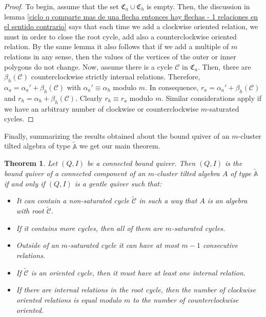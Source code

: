 \documentclass{amsart}
\theoremstyle{plain}
\newtheorem{teo}{Theorem}[section]
\theoremstyle{definition}
\begin{document}
\begin{proof}
To begin, assume that the set $\mathfrak{C}_a\cup \mathfrak{C}_h$ is empty. Then, the  discussion in lemma \ref{ciclo q comparte mas de una flecha entonces hay flechas - 1 relaciones en el sentido contrario} says that each time we add a clockwise oriented relation, we must in order to close the root cycle, add also a counterclockwise oriented relation. By the same lemma it also  follows that if we add  a multiple of $m$  relations in any sense, then the values of the vertices of the outer or inner polygons do not change. Now, assume there is a cycle $\mathcal{C}$ in $\mathfrak{C}_a$. Then, there are $\beta_h(\mathcal{C})$ counterclockwise strictly internal relations. Therefore, $\alpha_a=\alpha_a'+\beta_h(\mathcal{C})$ with $\alpha_a'\equiv \alpha_h$ modulo $m$. In consequence, $r_a=\alpha_a'+\beta_h(\mathcal{C})$ and $r_h=\alpha_h+ \beta_h(\mathcal{C})$. Clearly $r_h\equiv r_a$ modulo $m$. Similar considerations apply if we have an arbitrary number of  clockwise or counterclockwise $m$-saturated cycles.
\end{proof}

Finally, summarizing the results obtained about the bound quiver of an
 $m$-cluster tilted algebra of type $\widetilde{\mathbb{A}}$ we get our main theorem.

\begin{teo}
Let $(Q,I)$ be a connected bound quiver. Then $(Q,I)$ is the bound quiver of a connected component of an  $m$-cluster tilted algebra $A$ of type $\widetilde{\mathbb{A}}$ if and only if  $(Q,I)$ is a gentle  quiver such that:
\begin{itemize}
  \item [(a)] It can contain a non-saturated  cycle  $\widetilde{\mathcal{C}}$ in such a way that $A$ is an algebra with root $\widetilde{\mathcal{C}}$.
  \item [(b)] If it contains more cycles, then all of them are  $m$-saturated cycles.
  \item [(c)] Outside of an $m$-saturated cycle it can have at most  $m-1$ consecutive relations.
  \item [(d)] If  $\widetilde{\mathcal{C}}$ is an oriented  cycle, then it must have at least one internal relation.
  \item [(e)] If there are internal relations in the root cycle, then   the number  of clockwise oriented  relations   is equal modulo $m$ to the number of counterclockwise oriented.

\end{itemize}
\end{teo}
\end{document}
